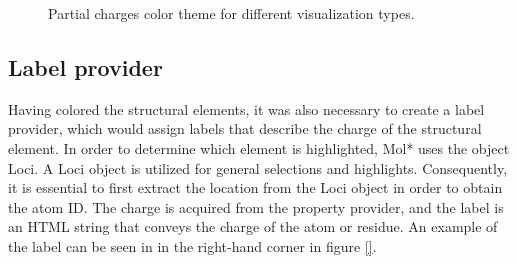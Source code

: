 \documentclass[
  digital,     %
  oneside,     %
  nosansbold,  %
  nocolorbold, %
  lof,         %
  lot,         %
]{fithesis4}
\begin{document}
\begin{figure}[htbp]
  \centering
  \caption{Partial charges color theme for different visualization types.}
  \label{fig:partial_charges_color_theme}
\end{figure}

\subsection{Label provider}
\label{subsection:label_provider}

Having colored the structural elements, it was also necessary to create a label provider, which would assign labels that describe the charge of the structural element. In order to determine which element is highlighted, Mol* uses the object Loci. A Loci object is utilized for general selections and highlights. Consequently, it is essential to first extract the location from the Loci object in order to obtain the atom ID. The charge is acquired from the property provider, and the label is an HTML string that conveys the charge of the atom or residue. An example of the label can be seen in in the right-hand corner in figure \ref{}.
\end{document}
